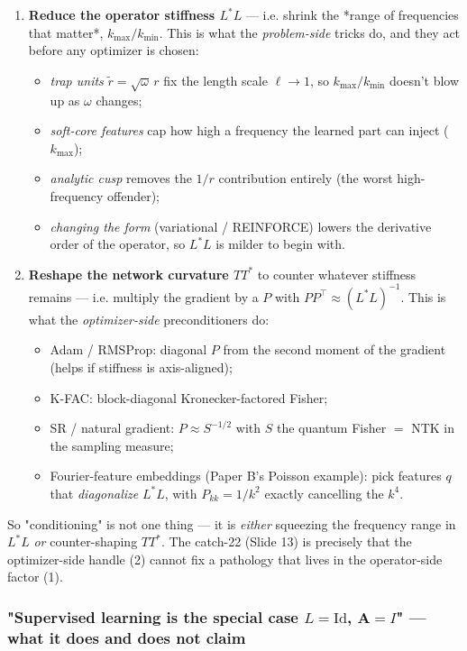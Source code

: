 \documentclass[11pt]{article}
\begin{document}
\begin{enumerate}
\item \textbf{Reduce the operator stiffness $L^*L$} --- i.e. shrink the *range of
frequencies that matter*, $k_{\max}/k_{\min}$. This is what the
\emph{problem-side} tricks do, and they act before any optimizer is chosen:
\begin{itemize}
\item \emph{trap units} $\tilde r=\sqrt\omega\,r$ fix the length scale $\ell\to1$,
so $k_{\max}/k_{\min}$ doesn't blow up as $\omega$ changes;
\item \emph{soft-core features} cap how high a frequency the learned part can
inject ($k_{\max}$);
\item \emph{analytic cusp} removes the $1/r$ contribution entirely (the worst
high-frequency offender);
\item \emph{changing the form} (variational / REINFORCE) lowers the derivative
order of the operator, so $L^*L$ is milder to begin with.
\end{itemize}
\item \textbf{Reshape the network curvature $TT^*$} to counter whatever stiffness
remains --- i.e. multiply the gradient by a $P$ with $PP^\top \approx
   (L^*L)^{-1}$. This is what the \emph{optimizer-side} preconditioners do:
\begin{itemize}
\item Adam / RMSProp: diagonal $P$ from the second moment of the gradient
(helps if stiffness is axis-aligned);
\item K-FAC: block-diagonal Kronecker-factored Fisher;
\item SR / natural gradient: $P \approx S^{-1/2}$ with $S$ the quantum
Fisher $=$ NTK in the sampling measure;
\item Fourier-feature embeddings (Paper B's Poisson example): pick features
$q$ that \emph{diagonalize} $L^*L$, with $P_{kk}=1/k^2$ exactly cancelling
the $k^4$.
\end{itemize}
\end{enumerate}
So "conditioning" is not one thing --- it is \emph{either} squeezing the frequency
range in $L^*L$ \emph{or} counter-shaping $TT^*$. The catch-22 (Slide 13) is
precisely that the optimizer-side handle (2) cannot fix a pathology that
lives in the operator-side factor (1).

\subsubsection*{"Supervised learning is the special case $L = \mathrm{Id}$, $\mathbf A = I$" --- what it does and does \textbf{not} claim}
\end{document}
